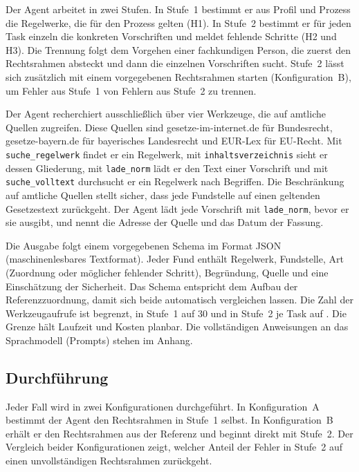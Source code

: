 Der Agent arbeitet in zwei Stufen.
In Stufe~1 bestimmt er aus Profil und Prozess die Regelwerke, die für den Prozess gelten (H1).
In Stufe~2 bestimmt er für jeden Task einzeln die konkreten Vorschriften und meldet fehlende Schritte (H2 und H3).
Die Trennung folgt dem Vorgehen einer fachkundigen Person, die zuerst den Rechtsrahmen absteckt und dann die einzelnen Vorschriften sucht.
Stufe~2 lässt sich zusätzlich mit einem vorgegebenen Rechtsrahmen starten (Konfiguration~B), um Fehler aus Stufe~1 von Fehlern aus Stufe~2 zu trennen.

Der Agent recherchiert ausschließlich über vier Werkzeuge, die auf amtliche Quellen zugreifen.
Diese Quellen sind gesetze-im-internet.de für Bundesrecht, gesetze-bayern.de für bayerisches Landesrecht und EUR-Lex für EU-Recht.
Mit \texttt{suche\_regelwerk} findet er ein Regelwerk, mit \texttt{inhaltsverzeichnis} sieht er dessen Gliederung, mit \texttt{lade\_norm} lädt er den Text einer Vorschrift und mit \texttt{suche\_volltext} durchsucht er ein Regelwerk nach Begriffen.
Die Beschränkung auf amtliche Quellen stellt sicher, dass jede Fundstelle auf einen geltenden Gesetzestext zurückgeht.
Der Agent lädt jede Vorschrift mit \texttt{lade\_norm}, bevor er sie ausgibt, und nennt die Adresse der Quelle und das Datum der Fassung.

Die Ausgabe folgt einem vorgegebenen Schema im Format JSON (maschinenlesbares Textformat).
Jeder Fund enthält Regelwerk, Fundstelle, Art (Zuordnung oder möglicher fehlender Schritt), Begründung, Quelle und eine Einschätzung der Sicherheit.
Das Schema entspricht dem Aufbau der Referenzzuordnung, damit sich beide automatisch vergleichen lassen.
Die Zahl der Werkzeugaufrufe ist begrenzt, in Stufe~1 auf 30 und in Stufe~2 je Task auf .
Die Grenze hält Laufzeit und Kosten planbar.
Die vollständigen Anweisungen an das Sprachmodell (Prompts) stehen im Anhang.

\subsection{Durchführung}\label{sec:durchfuehrung}
Jeder Fall wird in zwei Konfigurationen durchgeführt.
In Konfiguration~A bestimmt der Agent den Rechtsrahmen in Stufe~1 selbst.
In Konfiguration~B erhält er den Rechtsrahmen aus der Referenz und beginnt direkt mit Stufe~2.
Der Vergleich beider Konfigurationen zeigt, welcher Anteil der Fehler in Stufe~2 auf einen unvollständigen Rechtsrahmen zurückgeht.


